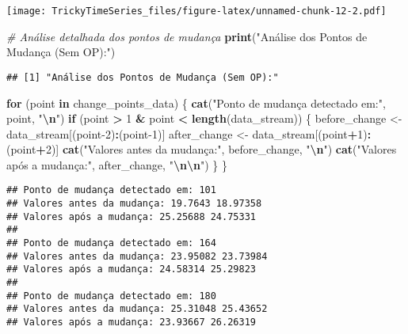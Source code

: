 \documentclass[
]{article}
\newenvironment{Shaded}{\begin{snugshade}}{\end{snugshade}}
\newcommand{\CommentTok}[1]{\textcolor[rgb]{0.56,0.35,0.01}{\textit{#1}}}
\newcommand{\ControlFlowTok}[1]{\textcolor[rgb]{0.13,0.29,0.53}{\textbf{#1}}}
\newcommand{\DecValTok}[1]{\textcolor[rgb]{0.00,0.00,0.81}{#1}}
\newcommand{\FunctionTok}[1]{\textcolor[rgb]{0.13,0.29,0.53}{\textbf{#1}}}
\newcommand{\NormalTok}[1]{#1}
\newcommand{\OtherTok}[1]{\textcolor[rgb]{0.56,0.35,0.01}{#1}}
\newcommand{\SpecialCharTok}[1]{\textcolor[rgb]{0.81,0.36,0.00}{\textbf{#1}}}
\newcommand{\StringTok}[1]{\textcolor[rgb]{0.31,0.60,0.02}{#1}}
\begin{document}
\texttt{[image: TrickyTimeSeries\_files/figure-latex/unnamed-chunk-12-2.pdf]}

\begin{Shaded}
\begin{Highlighting}[]
\CommentTok{\# Análise detalhada dos pontos de mudança}
\FunctionTok{print}\NormalTok{(}\StringTok{"Análise dos Pontos de Mudança (Sem OP):"}\NormalTok{)}
\end{Highlighting}
\end{Shaded}

\begin{verbatim}
## [1] "Análise dos Pontos de Mudança (Sem OP):"
\end{verbatim}

\begin{Shaded}
\begin{Highlighting}[]
\ControlFlowTok{for}\NormalTok{ (point }\ControlFlowTok{in}\NormalTok{ change\_points\_data) \{}
  \FunctionTok{cat}\NormalTok{(}\StringTok{"Ponto de mudança detectado em:"}\NormalTok{, point, }\StringTok{"}\SpecialCharTok{\textbackslash{}n}\StringTok{"}\NormalTok{)}
  \ControlFlowTok{if}\NormalTok{ (point }\SpecialCharTok{\textgreater{}} \DecValTok{1} \SpecialCharTok{\&}\NormalTok{ point }\SpecialCharTok{\textless{}} \FunctionTok{length}\NormalTok{(data\_stream)) \{}
\NormalTok{    before\_change }\OtherTok{\textless{}{-}}\NormalTok{ data\_stream[(point}\DecValTok{{-}2}\NormalTok{)}\SpecialCharTok{:}\NormalTok{(point}\DecValTok{{-}1}\NormalTok{)]}
\NormalTok{    after\_change }\OtherTok{\textless{}{-}}\NormalTok{ data\_stream[(point}\SpecialCharTok{+}\DecValTok{1}\NormalTok{)}\SpecialCharTok{:}\NormalTok{(point}\SpecialCharTok{+}\DecValTok{2}\NormalTok{)]}
    \FunctionTok{cat}\NormalTok{(}\StringTok{"Valores antes da mudança:"}\NormalTok{, before\_change, }\StringTok{"}\SpecialCharTok{\textbackslash{}n}\StringTok{"}\NormalTok{)}
    \FunctionTok{cat}\NormalTok{(}\StringTok{"Valores após a mudança:"}\NormalTok{, after\_change, }\StringTok{"}\SpecialCharTok{\textbackslash{}n\textbackslash{}n}\StringTok{"}\NormalTok{)}
\NormalTok{  \}}
\NormalTok{\}}
\end{Highlighting}
\end{Shaded}

\begin{verbatim}
## Ponto de mudança detectado em: 101 
## Valores antes da mudança: 19.7643 18.97358 
## Valores após a mudança: 25.25688 24.75331 
## 
## Ponto de mudança detectado em: 164 
## Valores antes da mudança: 23.95082 23.73984 
## Valores após a mudança: 24.58314 25.29823 
## 
## Ponto de mudança detectado em: 180 
## Valores antes da mudança: 25.31048 25.43652 
## Valores após a mudança: 23.93667 26.26319
\end{verbatim}
\end{document}
